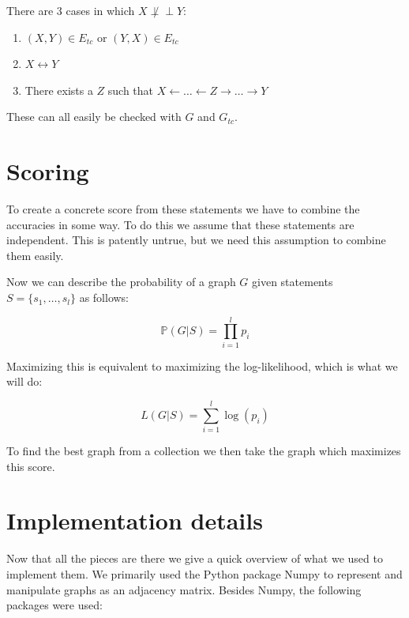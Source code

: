 \documentclass[11pt,a4paper]{report}
\theoremstyle{definition}
\def\ci{\perp\!\!\!\perp}
\begin{document}
There are 3 cases in which $X \not \ci Y$:
\begin{enumerate}
  \item $(X, Y) \in E_{tc}$ or $(Y, X) \in E_{tc}$

  \item $X \leftrightarrow Y$

  \item There exists a $Z$ such that $X \leftarrow \ldots \leftarrow Z
    \rightarrow \ldots \rightarrow Y$
\end{enumerate}
These can all easily be checked with $G$ and $G_{tc}$.

\section{Scoring}\label{sec:scoring}
To create a concrete score from these statements we have to combine the
accuracies in some way. To do this we assume that these statements are
independent. This is patently untrue, but we need this assumption to
combine them easily.

Now we can describe the probability of a graph $G$ given statements $S =
\{s_1, \ldots, s_l\}$ as follows:

\begin{equation*}
  \mathbb{P}(G | S) = \prod ^l_{i=1} p_i
\end{equation*}

Maximizing this is equivalent to maximizing the log-likelihood, which is
what we will do:

\begin{equation*}
  L(G|S) = \sum_{i=1}^l \log (p_i)
\end{equation*}

To find the best graph from a collection we then take the graph which
maximizes this score.

\section{Implementation details}
Now that all the pieces are there we give a quick overview of what we used
to implement them. We primarily used the Python package Numpy
\cite{harrisArrayProgrammingNumPy2020} to represent and manipulate graphs
as an adjacency matrix. Besides Numpy, the following packages were used:
\end{document}
